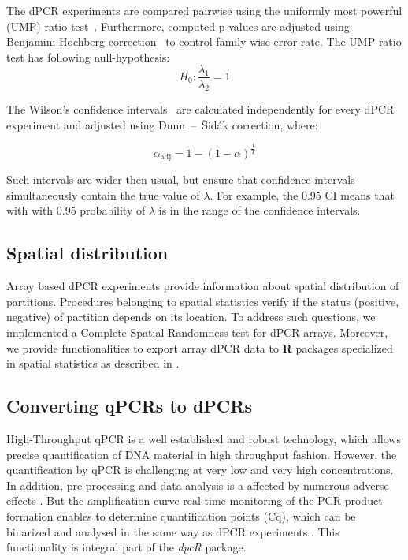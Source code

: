 \documentclass[a4,center,fleqn]{NAR}
\begin{document}
The dPCR experiments are compared pairwise using the uniformly most powerful 
(UMP) ratio test~\citep{fay_2010}. Furthermore, computed p-values are adjusted 
using Benjamini-Hochberg correction~\citep{benjamini_1995} to control 
family-wise error rate. The UMP ratio test has following null-hypothesis:
\begin{equation}
H_0: \frac{\lambda_1}{\lambda_2} = 1
\end{equation}

The Wilson's confidence intervals~\citep{brown_2001} are calculated 
independently for every dPCR experiment and adjusted using Dunn~--~\v{S}id\'{a}k 
correction, where:

\begin{equation}
\alpha_{\text{adj}} = 1 - (1 - \alpha)^\frac{1}{T}
\end{equation}

Such intervals are wider then usual, but ensure that confidence intervals 
simultaneously contain the true value of $\lambda$. For example, the 0.95 CI 
means that with with 0.95 probability of $\lambda$ is in the range of the 
confidence intervals.

\subsection{Spatial distribution}

Array based dPCR experiments provide information about spatial distribution of 
partitions. Procedures belonging to spatial statistics verify if the status 
(positive, negative) of partition depends on its location. To address such 
questions, we implemented a Complete Spatial Randomness test for dPCR arrays. 
Moreover, we provide functionalities to export array dPCR data to \textbf{R} 
packages specialized in spatial statistics as described in 
\cite{Baddeley_Turner_2005}.

\subsection{Converting qPCRs to dPCRs}

High-Throughput qPCR is a well established and robust technology, which allows 
precise quantification of DNA material in high throughput fashion. However, the 
quantification by qPCR is challenging at very low and very high concentrations. 
In addition, pre-processing and data analysis is a affected by numerous adverse 
effects \cite{ruijter_2013, pabinger_survey_2014, spiess_impact_2015}. But the 
amplification curve real-time monitoring of the PCR product formation enables to 
determine quantification points (Cq), which can be binarized and analysed in the 
same way as dPCR experiments \cite{mojtahedi_2014}. This functionality is integral part of the 
\textit{dpcR} package.
\end{document}

